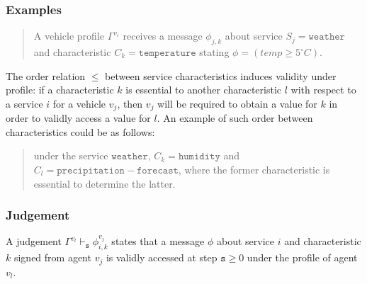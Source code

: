 \documentclass{beamer}
\begin{document}
\begin{frame}
	\label{error5}
	\frametitle{Examples}
	\smallskip


\begin{quote}
A vehicle profile $\Gamma^{v_{i}}$ receives a message $\phi_{j,k}$ about service $S_{j}=\mathtt{weather}$ and characteristic $C_{k}=\mathtt{temperature}$ stating $\phi= (temp \geq 5^\circ C)$.
\end{quote}

The order relation $\leq$ between service characteristics induces
validity under profile: if a characteristic $k$ is essential to
another characteristic $l$ with respect to a service $i$ for a vehicle
$v_{j}$, then $v_j$ will be required to obtain a value for  $k$ in
order to validly access a value for $l$. An example of such order
between characteristics could be as follows:

\begin{quote}
 under the service $\mathtt{weather}$, $C_{k}=\mathtt{humidity}$ and $C_{l}=\mathtt{precipitation-forecast}$, where the former characteristic is essential to determine the latter.
\end{quote}
\end{frame}


\begin{frame}
	\label{error5.1}
	\frametitle{Judgement}
	\smallskip


  \begin{definition}[Judgements]
  A judgement $\Gamma^{v_l} \vdash_{\mathtt{s}} \phi^{v_{j}}_{i,k}$ states that a message $\phi$ about service $i$ and characteristic $k$ signed from agent $v_{j}$  is validly accessed at step $\mathtt{s}\geq 0$ under the profile of agent $v_{l}$.
  \end{definition}

\end{frame}
\end{document}
